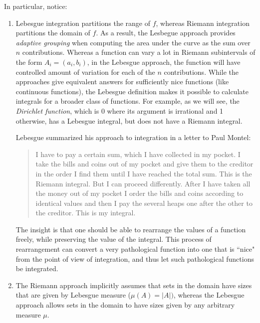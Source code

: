 \documentclass{article} %
\begin{document}
 In particular, notice:
\begin{enumerate}
\item Lebesgue integration partitions the range of $f$, whereas Riemann integration partitions the domain of $f$. As a result, the Lesbegue approach provides \textit{adaptive grouping} when computing the area under the curve as the sum over $n$ contributions.  Whereas a function can vary a lot in Riemann subintervals of the form $A_i = (a_i,b_i)$, in the Lebesgue approach, the function will have controlled amount of variation for each of the $n$ contributions.  While the approaches give equivalent answers for sufficiently nice functions (like continuous functions), the Lebesgue definition makes it possible to calculate integrals for a broader class of functions. For example, as we will see, the \textit{Dirichlet function}, which is 0 where its argument is irrational and 1 otherwise, has a Lebesgue integral, but does not have a Riemann integral.

Lebesgue summarized his approach to integration in a letter to Paul Montel:
\begin{quotation}
I have to pay a certain sum, which I have collected in my pocket.  I take the bills and coins out of my pocket and give them to the creditor in the order I find them until I have reached the total sum. This is the Riemann integral. But I can proceed differently. After I have taken all the money out of my pocket I order the bills and coins according to identical values and then I pay the several heaps one after the other to the creditor. This is my integral.
\end{quotation}



The insight is that one should be able to rearrange the values of a function freely, while preserving the value of the integral.  This process of rearrangement can convert a very pathological function into one that is ``nice" from the point of view of integration, and thus let such pathological functions be integrated.

\item The Riemann approach implicitly assumes that sets in the domain have sizes that are given by Lebesgue measure ($\mu(A) = |A|)$, whereas the Lebesgue approach allows sets in the domain to have sizes given by any arbitrary measure $\mu$.
\end{enumerate}
\end{document}
